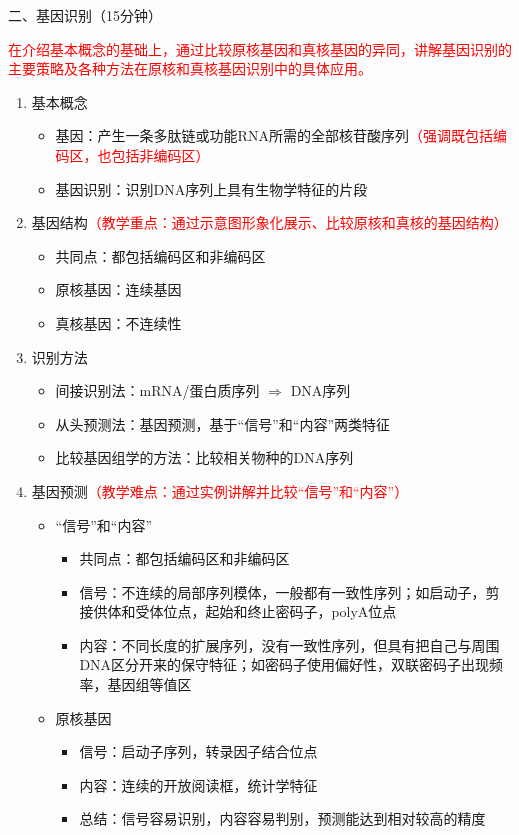 \documentclass{TIJMUjiaoanLL}
\begin{document}
\vspace*{0.2cm}
\noindent
二、基因识别（15分钟）

\textcolor{red}{在介绍基本概念的基础上，通过比较原核基因和真核基因的异同，讲解基因识别的主要策略及各种方法在原核和真核基因识别中的具体应用。}

\begin{enumerate}
  \item 基本概念
    \begin{itemize}
      \item 基因：产生一条多肽链或功能RNA所需的全部核苷酸序列\textcolor{red}{（强调既包括编码区，也包括非编码区）}
      \item 基因识别：识别DNA序列上具有生物学特征的片段
    \end{itemize}
  \item 基因结构\textcolor{red}{（教学重点：通过示意图形象化展示、比较原核和真核的基因结构）}
    \begin{itemize}
      \item 共同点：都包括编码区和非编码区
      \item 原核基因：连续基因
      \item 真核基因：不连续性
    \end{itemize}
  \item 识别方法
    \begin{itemize}
      \item 间接识别法：mRNA/蛋白质序列 $\Rightarrow$ DNA序列
      \item 从头预测法：基因预测，基于“信号”和“内容”两类特征
      \item 比较基因组学的方法：比较相关物种的DNA序列
    \end{itemize}
  \item 基因预测\textcolor{red}{（教学难点：通过实例讲解并比较“信号”和“内容”）}
    \begin{itemize}
      \item “信号”和“内容”
	\begin{itemize}
      \item 共同点：都包括编码区和非编码区
	  \item 信号：不连续的局部序列模体，一般都有一致性序列；如启动子，剪接供体和受体位点，起始和终止密码子，polyA位点
	  \item 内容：不同长度的扩展序列，没有一致性序列，但具有把自己与周围DNA区分开来的保守特征；如密码子使用偏好性，双联密码子出现频率，基因组等值区
	\end{itemize}
      \item 原核基因
	\begin{itemize}
	  \item 信号：启动子序列，转录因子结合位点
	  \item 内容：连续的开放阅读框，统计学特征
	  \item 总结：信号容易识别，内容容易判别，预测能达到相对较高的精度
	\end{itemize}
    \end{itemize}



\end{enumerate}
\end{document}
